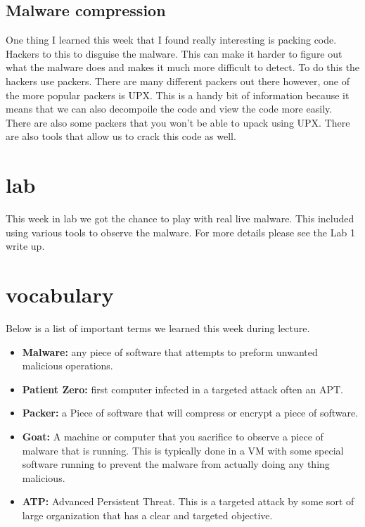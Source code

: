 \documentclass[letterpaper, onecolumn,10pt]{IEEEtran}
\begin{document}
		    
		    \subsection{Malware compression} One thing I learned this week that I found really interesting is packing code. Hackers to this to disguise the malware. This can make it harder to figure out what the malware does and makes it much more difficult to detect. To do this the hackers use packers. There are many different packers out there however, one of the more popular packers is UPX. This is a handy bit of information because it means that we can also decompoile the code and view the code more easily. There are also some packers that you won't be able to upack using UPX. There are also tools that allow us to crack this code as well.\\

        \section{lab} This week in lab we got the chance to play with real live malware. This included using various tools to observe the malware. For more details please see the Lab 1 write up.\\

		\section{vocabulary}
		    Below is a list of important terms we learned this week during lecture.\\
		    \begin{itemize}
		        \item \textbf{Malware:} any piece of software that attempts to preform unwanted malicious operations.\\
		        \item \textbf{Patient Zero:} first computer infected in a targeted attack often an APT.\\
		        \item \textbf{Packer:} a Piece of software that will compress or encrypt a piece of software.\\
		        \item \textbf{Goat:} A machine or computer that you sacrifice to observe a piece of malware that is running. This is typically done in a VM with some special software running to prevent the malware from actually doing any thing malicious.\\
		        \item \textbf{ATP: } Advanced Persistent Threat. This is a targeted attack by some sort of large organization that has a clear and targeted objective.\\
		    \end{itemize}
		
\end{document}
